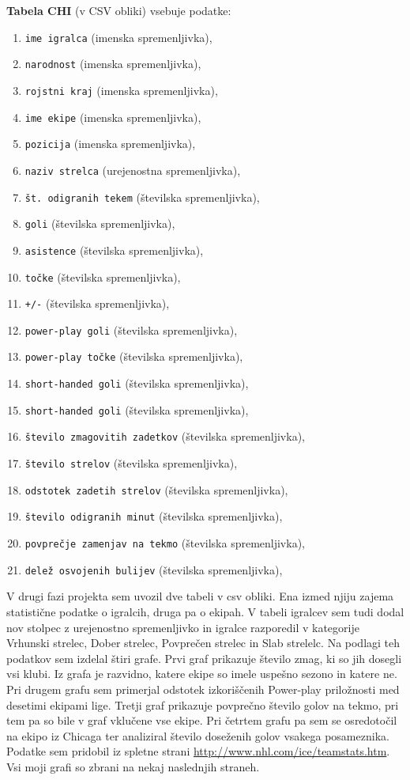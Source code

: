 \documentclass[11pt,a4paper]{article}
\begin{document}
\textbf{Tabela CHI} (v CSV obliki) vsebuje podatke:
\begin{enumerate}

\item{\verb|ime igralca| (imenska spremenljivka),}
\item{\verb|narodnost| (imenska spremenljivka),}
\item{\verb|rojstni kraj| (imenska spremenljivka),}
\item{\verb|ime ekipe| (imenska spremenljivka),}
\item{\verb|pozicija| (imenska spremenljivka),}
\item{\verb|naziv strelca| (urejenostna spremenljivka),}
\item{\verb|št. odigranih tekem| (številska spremenljivka),}
\item{\verb|goli| (številska spremenljivka),}
\item{\verb|asistence| (številska spremenljivka),}
\item{\verb|točke| (številska spremenljivka),}
\item{\verb|+/-| (številska spremenljivka),}
\item{\verb|power-play goli| (številska spremenljivka),}
\item{\verb|power-play točke| (številska spremenljivka),}
\item{\verb|short-handed goli| (številska spremenljivka),}
\item{\verb|short-handed goli| (številska spremenljivka),}
\item{\verb|število zmagovitih zadetkov| (številska spremenljivka),}
\item{\verb|število strelov| (številska spremenljivka),}
\item{\verb|odstotek zadetih strelov| (številska spremenljivka),}
\item{\verb|število odigranih minut| (številska spremenljivka),}
\item{\verb|povprečje zamenjav na tekmo| (številska spremenljivka),}
\item{\verb|delež osvojenih bulijev| (številska spremenljivka),}

\end{enumerate}

V drugi fazi projekta sem uvozil dve tabeli v csv obliki. Ena izmed njiju zajema statistične podatke o igralcih, druga pa o ekipah. V tabeli igralcev sem tudi dodal nov stolpec z urejenostno spremenljivko in igralce razporedil v kategorije Vrhunski strelec, Dober strelec, Povprečen strelec in Slab strelelc. Na podlagi teh podatkov sem izdelal štiri grafe. Prvi graf prikazuje število zmag, ki so jih dosegli vsi klubi. Iz grafa je razvidno, katere ekipe so imele uspešno sezono in katere ne. Pri drugem grafu sem primerjal odstotek izkoriščenih Power-play priložnosti med desetimi ekipami lige. Tretji graf prikazuje povprečno število golov na tekmo, pri tem pa so bile v graf vklučene vse ekipe. Pri četrtem grafu pa sem se osredotočil na ekipo iz Chicaga ter analiziral število doseženih golov vsakega posameznika. Podatke sem pridobil iz spletne strani \url{http://www.nhl.com/ice/teamstats.htm}. Vsi moji grafi so zbrani na nekaj naslednjih straneh.
\end{document}

